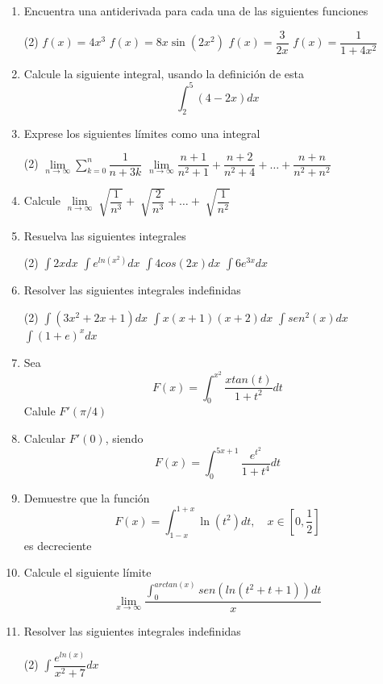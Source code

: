 \documentclass[12pt]{article}
\newenvironment{preguntas}
{\begin{enumerate}\itemsep12pt
	}
	{
	\end{enumerate}
}
\newcommand{\ra}{\rightarrow}
\begin{document}
\begin{preguntas}
\item Encuentra una antiderivada para cada una de las siguientes funciones
\begin{tasks}(2)
\task $f(x) = 4x^3$
\task $f(x) = 8x\sin (2x^2)$
\task $f(x) = \dfrac{3}{2x}$
\task $f(x) = \dfrac{1}{1+4x^2}$
\end{tasks}
\item Calcule la siguiente integral, usando la definición de esta
	$$\int_2^5(4-2x)dx$$
\item Exprese los siguientes límites como una integral
	
\begin{tasks}(2)
\task $\lim\limits_{n\ra \infty} \sum\limits_{k=0}^n \dfrac{1}{n+3k}$
\task $\lim\limits_{n \ra \infty} \dfrac{n+1}{n^2+1} + \dfrac{n+2}{n^2+4} + \dots  + \dfrac{n+n}{n^2+n^2}$
\end{tasks}
\item Calcule $\lim\limits_{n \ra \infty} \sqrt[]{\dfrac{1}{n^3}} + \sqrt[]{\dfrac{2}{n^3}} + \dots  + \sqrt[]{\dfrac{1}{n^2}}$
\item Resuelva las siguientes integrales
\begin{tasks}(2)
\task $\displaystyle\int 2xdx$
\task $\displaystyle\int e^{ln(x^2)}dx$
\task $\displaystyle\int 4cos(2x)dx$
\task $\displaystyle\int 6e^{3x}dx$
\end{tasks}
\item Resolver las siguientes integrales indefinidas
\begin{tasks}(2)
\task $\displaystyle\int (3x^2 + 2x + 1)dx$
\task $\displaystyle\int x(x+1)(x+2)dx$
\task $\displaystyle\int sen^2(x)dx$
\task $\displaystyle\int (1+e)^xdx$
\end{tasks}
\item Sea
$$F(x) = \displaystyle\int_0^{x^2} \dfrac{xtan(t)}{1+t^2}dt$$
	Calule $F'(\pi /4)$
\item Calcular $F'(0)$, siendo
	$$F(x) = \displaystyle\int_0^{5x+1} \dfrac{e^{t^2}}{1+t^4}dt$$
\item Demuestre que la función
$$F(x) = \displaystyle\int_{1-x}^{1+x} \ln(t^2)dt, \quad x \in [0, \frac{1}{2}]$$
es decreciente
\item Calcule el siguiente límite
	$$\lim\limits_{x \ra \infty} \dfrac{\displaystyle\int_0^{arctan(x)} sen(ln(t^2+t+1)) dt}{x}$$
\item Resolver las siguientes integrales indefinidas
\begin{tasks}(2)
\task $\displaystyle\int \dfrac{e^{ln(x)}}{x^2+7}dx$

\end{tasks}
\end{preguntas}
\end{document}
